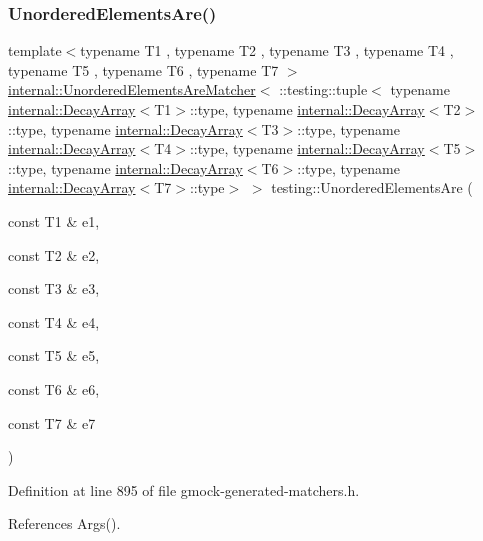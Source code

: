 \subsubsection{\texorpdfstring{Unordered\+Elements\+Are()}{UnorderedElementsAre()}\hspace{0.1cm}{\footnotesize\ttfamily [8/11]}}
{\footnotesize\ttfamily template$<$typename T1 , typename T2 , typename T3 , typename T4 , typename T5 , typename T6 , typename T7 $>$ \\
\hyperlink{classtesting_1_1internal_1_1UnorderedElementsAreMatcher}{internal\+::\+Unordered\+Elements\+Are\+Matcher}$<$ \+::testing\+::tuple$<$ typename \hyperlink{structtesting_1_1internal_1_1DecayArray}{internal\+::\+Decay\+Array}$<$T1$>$\+::type, typename \hyperlink{structtesting_1_1internal_1_1DecayArray}{internal\+::\+Decay\+Array}$<$T2$>$\+::type, typename \hyperlink{structtesting_1_1internal_1_1DecayArray}{internal\+::\+Decay\+Array}$<$T3$>$\+::type, typename \hyperlink{structtesting_1_1internal_1_1DecayArray}{internal\+::\+Decay\+Array}$<$T4$>$\+::type, typename \hyperlink{structtesting_1_1internal_1_1DecayArray}{internal\+::\+Decay\+Array}$<$T5$>$\+::type, typename \hyperlink{structtesting_1_1internal_1_1DecayArray}{internal\+::\+Decay\+Array}$<$T6$>$\+::type, typename \hyperlink{structtesting_1_1internal_1_1DecayArray}{internal\+::\+Decay\+Array}$<$T7$>$\+::type$>$ $>$ testing\+::\+Unordered\+Elements\+Are (\begin{DoxyParamCaption}\item[{const T1 \&}]{e1,  }\item[{const T2 \&}]{e2,  }\item[{const T3 \&}]{e3,  }\item[{const T4 \&}]{e4,  }\item[{const T5 \&}]{e5,  }\item[{const T6 \&}]{e6,  }\item[{const T7 \&}]{e7 }\end{DoxyParamCaption})\hspace{0.3cm}{\ttfamily [inline]}}



Definition at line 895 of file gmock-\/generated-\/matchers.\+h.



References Args().


